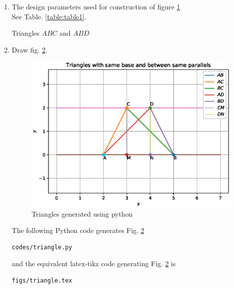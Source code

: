 \renewcommand{\theequation}{\theenumi}
\begin{enumerate}[label=\thesection.\arabic*.,ref=\thesection.\theenumi]

\begin{figure}[!ht]
\centering
\resizebox{\columnwidth}{!}{}
\caption{Triangles by Latex-Tikz}
\label{fig:triangle1}	
\end{figure}

\item The design parameters used for construction of figure \ref{fig:triangle1} \\

\solution See Table. \ref{table:table1}.
\begin{table}[ht!]
\centering

\caption{Triangles $ABC$ and $ABD$}
\label{table:table1}	
\end{table}

\item Draw fig. \ref{fig:triangle2}.

\begin{figure}[!ht]
\centering
\includegraphics[width=\columnwidth]{./codes/triangle.eps}
\caption{Triangles generated using python}
\label{fig:triangle2}
\end{figure} 

\solution The  following Python code generates Fig. \ref{fig:triangle2}

\begin{lstlisting}
codes/triangle.py
\end{lstlisting}

and the equivalent latex-tikz code generating Fig. \ref{fig:triangle2} is 
\begin{lstlisting}
figs/triangle.tex
\end{lstlisting}
%
\end{enumerate}